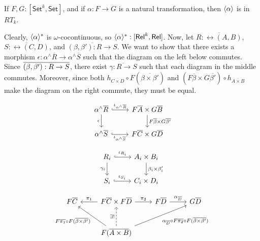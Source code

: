 \documentclass{lmcs}
\theoremstyle{plain}\newtheorem{satz}[thm]{Satz}
\newcommand{\set}{\mathsf{Set}}
\begin{document}
\begin{lem}\label{lem:graph-reln-functors}
If $F,G : [\set^k,\set]$, and if $\alpha : F \to G$ is a natural
transformation, then $\langle {\alpha} \rangle$ is in $RT_k$.
\end{lem}
\proof
Clearly, $\langle {\alpha} \rangle^*$ is $\omega$-cocontinuous, so
$\langle {\alpha} \rangle^* : [\mathsf{Rel}^k,\mathsf{Rel}]$. Now, let $\overline{R :
  \rel(A, B)}$, $\overline{S : \rel(C, D)}$, and $\overline{(\beta,
  \beta') : R \to S}$. We want to show that there exists a morphism
$\epsilon : \alpha^\wedge\overline{R} \to \alpha^\wedge\overline{S}$
such that the diagram on the left below commutes. Since
$\overline{(\beta,\beta') : R \to S}$, there exist $\overline{\gamma : R \to
  S}$ such that each diagram in the middle commutes.
Moreover, since both $h_{\overline{C \times D}} \circ
F(\overline{\beta \times \beta'})$ and $(F\overline{\beta} \times
G\overline{\beta'}) \circ h_{\overline{A \times B}}$ make the diagram
on the right commute, they must be equal.
\begin{figure*}[ht]
\vspace*{-0.1in}
  \hspace*{-0.85in}
  \begin{minipage}[b]{0.25\linewidth}
 {\small    \[
    \begin{tikzcd}
        \alpha^\wedge\overline{R}
        \ar[r, hookrightarrow, "{\iota_{\alpha^\wedge\overline{R}}}"]
        \ar[d, "{\epsilon}"']
        & F\overline{A} \times G\overline{B}
        \ar[d, "{F\overline{\beta} \times G\overline{\beta'}}"] \\
        \alpha^\wedge\overline{S}
        \ar[r, hookrightarrow, "{\iota_{\alpha^\wedge\overline{S}}}"']
        & F\overline{C} \times G\overline{D}
    \end{tikzcd}
    \]}
\end{minipage}
\begin{minipage}[b]{0.25\linewidth}
{\small    \[
    \begin{tikzcd}
        R_i
        \ar[d, "{\gamma_i}"']
        \ar[r, hookrightarrow, "{\iota_{R_i}}"]
        &A_i \times B_i
        \ar[d, "{\beta_i \times \beta'_i}"] \\
        S_i
        \ar[r, hookrightarrow, "{\iota_{S_i}}"]
        &C_i \times D_i
    \end{tikzcd}
    \]}
\end{minipage}
\begin{minipage}[b]{0.25\linewidth}
{\footnotesize \[
      \begin{tikzcd}[row sep = large]
          F\overline{C}
          &F\overline{C} \times F\overline{D}
          \ar[l, "{\pi_1}"'] \ar[r, "{\pi_2}"]
          &F\overline{D}
          \ar[r, "{\alpha_{\ol{D}}}"]
          &G\overline{D}\\
          &F(\overline{A \times B})
          \ar[u, dashed, "{\exists !}"]
          \ar[ul, "{F\ol{\pi_1} \circ F(\overline{\beta \times \beta'})}"]
          \ar[urr, "{\alpha_{\ol{D}} \circ F\ol{\pi_2} \circ F(\overline{\beta \times \beta'})}"']
      \end{tikzcd}
      \]}
\end{minipage}
\end{figure*}
\end{document}
